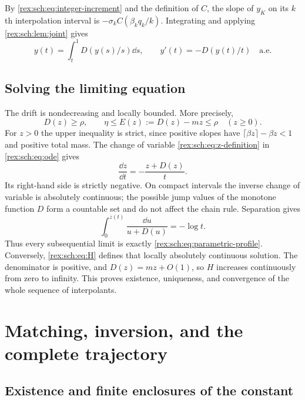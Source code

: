 By \eqref{rex:sch:eq:integer-increment} and the definition of $C$, the slope
of $y_K$ on its $k$th interpolation interval is
$-\sigma_k C(\beta_kq_k/k)$. Integrating and applying
\cref{rex:sch:lem:joint} gives
\begin{equation}\label{rex:sch:eq:ode}
 y(t)=\int_t^1D(y(s)/s)\dd s,
 \qquad y'(t)=-D(y(t)/t)\quad\text{a.e.}
\end{equation}

\subsection{Solving the limiting equation}

The drift is nondecreasing and locally bounded. More precisely,
\begin{equation}\label{rex:sch:eq:drift-bounds}
 D(z)\geq\rho,\qquad
 \eta\leq E(z):=D(z)-mz\leq\rho\quad(z\geq0).
\end{equation}
For $z>0$ the upper inequality is strict, since positive slopes have
$\lceil\beta z\rceil-\beta z<1$ and positive total mass.
The change of variable \eqref{rex:sch:eq:z-definition} in \eqref{rex:sch:eq:ode}
gives
\begin{equation}\label{rex:sch:eq:z-ode}
 \frac{\dd z}{\dd t}=-\frac{z+D(z)}t.
\end{equation}
Its right-hand side is strictly negative. On compact intervals the
inverse change of variable is absolutely continuous; the possible
jump values of the monotone function $D$ form a countable set and
do not affect the chain rule. Separation gives
\[
 \int_0^{z(t)}\frac{\dd u}{u+D(u)}=-\log t.
\]
Thus every subsequential limit is exactly
\eqref{rex:sch:eq:parametric-profile}. Conversely, \eqref{rex:sch:eq:H} defines that
locally absolutely continuous solution. The denominator is positive,
and $D(z)=mz+O(1)$, so $H$ increases continuously from zero to
infinity. This proves existence, uniqueness, and convergence of the
whole sequence of interpolants.

\section{Matching, inversion, and the complete trajectory}
\label{rex:sch:sec:matching}

\subsection{Existence and finite enclosures of the constant}

